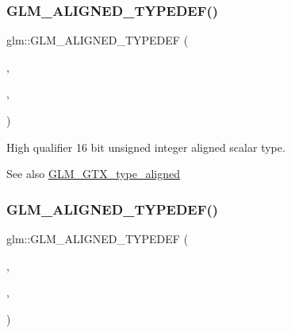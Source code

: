 \subsubsection{\texorpdfstring{G\+L\+M\+\_\+\+A\+L\+I\+G\+N\+E\+D\+\_\+\+T\+Y\+P\+E\+D\+E\+F()}{GLM\_ALIGNED\_TYPEDEF()}\hspace{0.1cm}{\footnotesize\ttfamily [102/209]}}
{\footnotesize\ttfamily glm\+::\+G\+L\+M\+\_\+\+A\+L\+I\+G\+N\+E\+D\+\_\+\+T\+Y\+P\+E\+D\+EF (\begin{DoxyParamCaption}\item[{\mbox{\hyperlink{group__gtc__type__precision_ga9da2178d7501d9c0f225fa1a7b70cb45}{highp\+\_\+u16}}}]{,  }\item[{aligned\+\_\+highp\+\_\+u16}]{,  }\item[{2}]{ }\end{DoxyParamCaption})}

High qualifier 16 bit unsigned integer aligned scalar type. \begin{DoxySeeAlso}{See also}
\mbox{\hyperlink{group__gtx__type__aligned}{G\+L\+M\+\_\+\+G\+T\+X\+\_\+type\+\_\+aligned}} 
\end{DoxySeeAlso}
\mbox{\label{group__gtx__type__aligned_gaaadbb34952eca8e3d7fe122c3e167742}} 
\subsubsection{\texorpdfstring{G\+L\+M\+\_\+\+A\+L\+I\+G\+N\+E\+D\+\_\+\+T\+Y\+P\+E\+D\+E\+F()}{GLM\_ALIGNED\_TYPEDEF()}\hspace{0.1cm}{\footnotesize\ttfamily [103/209]}}
{\footnotesize\ttfamily glm\+::\+G\+L\+M\+\_\+\+A\+L\+I\+G\+N\+E\+D\+\_\+\+T\+Y\+P\+E\+D\+EF (\begin{DoxyParamCaption}\item[{\mbox{\hyperlink{group__gtc__type__precision_gae8e8a2c712653891a03c171795286ac5}{highp\+\_\+u32}}}]{,  }\item[{aligned\+\_\+highp\+\_\+u32}]{,  }\item[{4}]{ }\end{DoxyParamCaption})}

